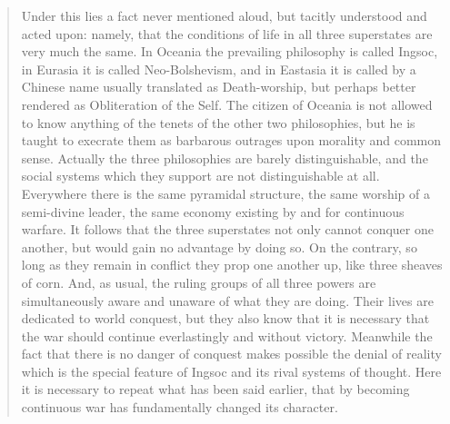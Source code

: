 \begin{quotation}
Under this lies a fact never mentioned aloud, but tacitly understood and
acted upon: namely, that the conditions of life in all three superstates
are very much the same. In Oceania the prevailing philosophy is called
Ingsoc, in Eurasia it is called Neo-Bolshevism, and in Eastasia it is
called by a Chinese name usually translated as Death-worship, but
perhaps better rendered as Obliteration of the Self. The citizen of
Oceania is not allowed to know anything of the tenets of the other two
philosophies, but he is taught to execrate them as barbarous outrages
upon morality and common sense. Actually the three philosophies are
barely distinguishable, and the social systems which they support are
not distinguishable at all. Everywhere there is the same pyramidal
structure, the same worship of a semi-divine leader, the same economy
existing by and for continuous warfare. It follows that the three
superstates not only cannot conquer one another, but would gain no
advantage by doing so. On the contrary, so long as they remain in
conflict they prop one another up, like three sheaves of corn. And, as
usual, the ruling groups of all three powers are simultaneously aware
and unaware of what they are doing. Their lives are dedicated to world
conquest, but they also know that it is necessary that the war should
continue everlastingly and without victory. Meanwhile the fact that
there is no danger of conquest makes possible the denial of reality
which is the special feature of Ingsoc and its rival systems of thought.
Here it is necessary to repeat what has been said earlier, that by
becoming continuous war has fundamentally changed its character.
\end{quotation}

